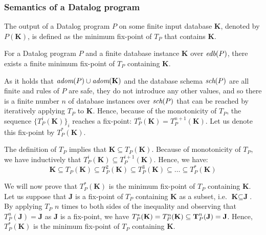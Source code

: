 \subsubsection{Semantics of a Datalog program}
The output of a Datalog program $P$ on some finite input database $\textbf{K}$, denoted by $P(\textbf{K})$, is defined as the minimum fix-point of $T_P$ that contains $\textbf{K}$.

\begin{thm}\label{t:datalogfixpointsem}
For a Datalog program $P$ and a finite database instance $\textbf{K}$ over $\textit{edb}(P)$, there exists a finite minimum fix-point of $T_P$ containing $\textbf{K}$.
\end{thm}
\begin{prof}
As it holds that $\textit{adom}(P) \cup \textit{adom}(\textbf{K})$ and the database schema $\textit{sch}(P)$ are all finite and rules of $P$ are safe, they do not introduce any other values, and so there is a finite number $n$ of database instances over $\textit{sch}(P)$ that can be reached by iteratively applying $T_P$ to $\textbf{K}$. Hence, because of the monotonicity of $T_P$, the sequence $\{T_P^i(\textbf{K})\}_i$ reaches a fix-point: $T_P^n(\textbf{K}) = T_P^{n+1}(\textbf{K})$. Let us denote this fix-point by $T_P^*(\textbf{K})$.

The definition of $T_P$ implies that $\textbf{K} \subseteq T_P(\textbf{K})$.
Because of monotonicity of $T_P$, we have inductively that $T_P^i(\textbf{K}) \subseteq T_P^{i+1}(\textbf{K})$.
Hence, we have:
$$\textbf{K} \subseteq T_P(\textbf{K}) \subseteq T_P^2(\textbf{K}) \subseteq T_P^3(\textbf{K}) \subseteq \dots \subseteq T_P^*(\textbf{K})$$

We will now prove that $T_P^*(\textbf{K})$ is the minimum fix-point of $T_P$ containing $\textbf{K}$. Let us suppose that $\textbf{J}$ is a fix-point of $T_P$ containing  $\textbf{K}$ as a subset, i.e.  $\textbf{K} \subseteq \textbf{J}$. By applying $T_P$ $n$ times to both sides of the inequality and observing that $T_P^n(\textbf{J}) = \textbf{J}$ as $\textbf{J}$ is a fix-point, we have $T_P^*(\textbf{K}) = T_P^n(\textbf{K}) \subseteq \textbf T_P^n(\textbf{J}) = \textbf{J}$. Hence, $T_P^*(\textbf{K})$ is the minimum fix-point of $T_P$ containing $\textbf{K}$.
\QEDA
\end{prof}



